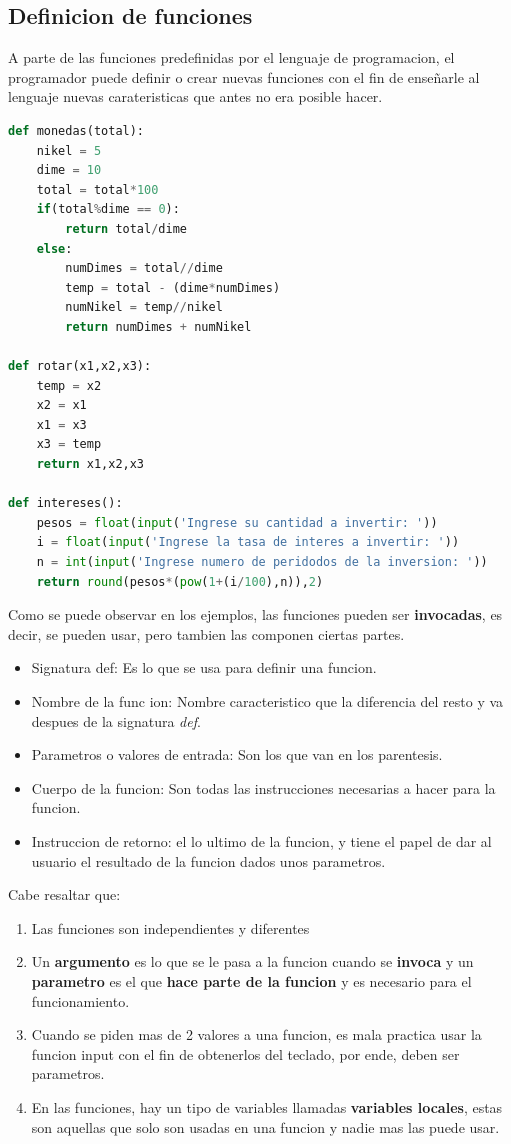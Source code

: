 \documentclass{article}
\begin{document}
\subsection{Definicion de funciones}
A parte de las funciones predefinidas por el lenguaje de programacion, el programador puede definir o crear nuevas funciones con el fin de enseñarle al lenguaje nuevas carateristicas que antes no era posible hacer.
\begin{lstlisting}[language=Python, caption=Ejemplos de funciones]
def monedas(total):
    nikel = 5
    dime = 10
    total = total*100
    if(total%dime == 0):
        return total/dime
    else:
        numDimes = total//dime
        temp = total - (dime*numDimes)
        numNikel = temp//nikel
        return numDimes + numNikel

def rotar(x1,x2,x3):
    temp = x2
    x2 = x1
    x1 = x3
    x3 = temp  
    return x1,x2,x3

def intereses():
    pesos = float(input('Ingrese su cantidad a invertir: '))
    i = float(input('Ingrese la tasa de interes a invertir: '))
    n = int(input('Ingrese numero de peridodos de la inversion: '))
    return round(pesos*(pow(1+(i/100),n)),2)
\end{lstlisting}
Como se puede observar en los ejemplos, las funciones pueden ser \textbf{invocadas}, es decir, se pueden usar, pero tambien las componen ciertas partes. 
\begin{itemize}
    \item Signatura def: Es lo que se usa para definir una funcion. 
    \item Nombre de la func ion: Nombre caracteristico que la diferencia del resto y va despues de la signatura \textit{def}.
    \item Parametros o valores de entrada: Son los que van en los parentesis.
    \item Cuerpo de la funcion: Son todas las instrucciones necesarias a hacer para la funcion.
    \item Instruccion de retorno: el lo ultimo de la funcion, y tiene el papel de dar al usuario el resultado de la funcion dados unos parametros.
\end{itemize}
Cabe resaltar que: 
\begin{enumerate}
    \item Las funciones son independientes y diferentes
    \item Un \textbf{argumento} es lo que se le pasa a la funcion cuando se \textbf{invoca} y un \textbf{parametro} es el que \textbf{hace parte de la funcion} y es necesario para el funcionamiento. 
    \item Cuando se piden mas de 2 valores a una funcion, es mala practica usar la funcion input con el fin de obtenerlos del teclado, por ende, deben ser parametros.
    \item En las funciones, hay un tipo de variables llamadas \textbf{variables locales}, estas son aquellas que solo son usadas en una funcion y nadie mas las puede usar. 
\end{enumerate}
\end{document}
